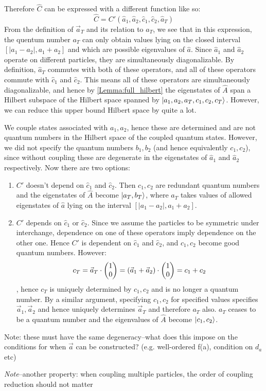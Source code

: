 \documentclass[12pt]{article}
\begin{document}
	Therefore $\hat{C}$ can be expressed with a different function like so:
	$$\hat{C}=C'\left(\hat{a}_1,\hat{a}_2,\hat{c}_1,\hat{c}_2,\hat{a}_T\right)$$
	From the definition of $\vec{a}_T$ and its relation to $a_T$, we see that in this expression, the quentum number $a_T$ can only obtain values lying on the closed interval $[|a_1-a_2|,a_1+a_2]$ and which are possible eigenvalues of $\hat{a}$.
	Since $\hat{a}_1$ and $\hat{a}_2$ operate on different particles, they are simultaneously diagonalizable. By definition, $\hat{a}_T$ commutes with both of these operators, and all of these operators commute with $\hat{c}_1$ and $\hat{c}_2$. This means all of these operators are simultaneously diagonalizable, and hence by \ref{Lemma:full_hilbert} the eigenstates of $\hat{A}$ span a Hilbert subspace of the Hilbert space spanned by $\ket{a_1,a_2,a_T,c_1,c_2,c_T}$. However, we can reduce this upper bound Hilbert space by quite a lot.
	
	We couple states associated with $a_1,a_2$, hence these are determined and are not quantum numbers in the Hilbert space of the coupled quantum states. However, we did not specify the quantum numbers $b_1,b_2$ (and hence equivalently $c_1,c_2$), since without coupling these are degenerate in the eigenstates of $\hat{a}_1$ and $\hat{a}_2$ respectively. Now there are two options:
	\begin{enumerate}
	\item $C'$ doesn't depend on $\hat{c}_1$ and $\hat{c}_2$. Then $c_1,c_2$ are redundant quantum numbers and the eigenstates of $\hat{A}$ become $\ket{a_T,b_T}$, where $a_T$ takes values of allowed eigenstates of $\hat{a}$ lying on the interval $[|a_1-a_2|, a_1+a_2]$.
	\item $C'$ depends on $\hat{c}_1$ or $\hat{c}_2$. Since we assume the particles to be symmetric under interchange, dependence on one of these operators imply dependence on the other one. Hence $C'$ is dependent on $\hat{c}_1$ and $\hat{c}_2$, and $c_1,c_2$ become good quantum numbers. However:
	$$c_T=\vec{a}_T\cdot \mqty(1\\0)=\left(\vec{a}_1+\vec{a}_2\right)\cdot\mqty(1\\0)=c_1+c_2$$, hence $c_T$ is uniquely determined by $c_1,c_2$ and is no longer a quantum number. By a similar argument, specifying $c_1,c_2$ for specified values specifies $\vec{a}_1,\vec{a}_2$ and hence uniquely determines $\vec{a}_T$ and therefore $a_T$ also. $a_T$ ceases to be a quantum number and the eigenvalues of $\hat{A}$ become $\ket{c_1,c_2}$.
	\end{enumerate}
	
	Note: these must have the same degeneracy--what does this impose on the conditions for when $\vec{a}$ can be constructed? (e.g. well-ordered f(a), condition on $d_a$ etc)
	
	\textit{Note}--another property: when coupling multiple particles, the order of coupling reduction should not matter
	
	
	
\end{document}
